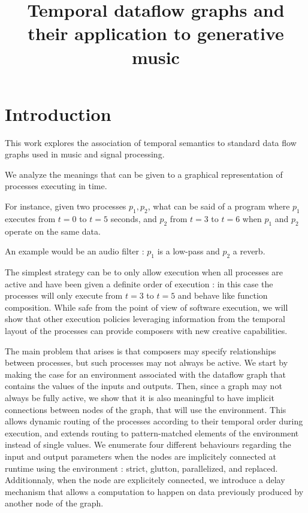 \documentclass{article}
\title{Temporal dataflow graphs and their application to generative music}
\begin{document}
    
    \capstartfalse
    \maketitle
    \capstarttrue
    
	\section{Introduction}
    This work explores the association of temporal semantics to standard data flow graphs used in music and signal processing.
    
    We analyze the meanings that can be given to a graphical representation of processes executing in time. 
    
    For instance, given two processes $p_1, p_2$, what can be said of a program where $p_1$ executes from $t=0$ to $t=5$ seconds, and $p_2$ from $t=3$ to $t=6$ when $p_1$ and $p_2$ operate on the same data.
    
    An example would be an audio filter : $p_1$ is a low-pass and $p_2$ a reverb.
    
    The simplest strategy can be to only allow execution when all processes are active and have been given a definite order of execution : in this case the processes will only execute from $t=3$ to $t=5$ and behave like function composition. 
    While safe from the point of view of software execution, we will show that other execution policies leveraging information from the temporal layout of the processes can provide composers with new creative capabilities.
    
    The main problem that arises is that composers may specify relationships between processes, but such processes may not always be active. 
    We start by making the case for an environment associated with the dataflow graph that contains the values of the inputs and outputs.
    Then, since a graph may not always be fully active, we show that it is also meaningful to have implicit connections between nodes of the graph, that will use the environment.
    This allows dynamic routing of the processes according to their temporal order during execution, and extends routing to pattern-matched elements of the environment instead of single values.
    We enumerate four different behaviours regarding the input and output parameters when the nodes are implicitely connected at runtime using the environment : strict, glutton, parallelized, and replaced. 
    Additionnaly, when the node are explicitely connected, we introduce a delay mechanism that allows a computation to happen on data previously produced by another node of the graph.
\end{document}
